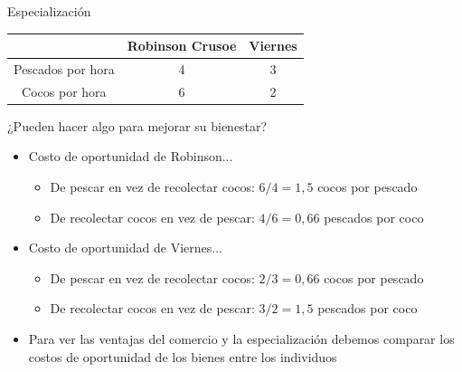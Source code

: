 \documentclass{beamer}
\begin{document}
\begin{frame}{Especialización}
    \begin{center}
        \begin{tabular}{|c|c|c|} \hline
            & Robinson Crusoe & Viernes \\ \hline
            Pescados por hora   & 4 & 3 \\ \hline
            Cocos por hora   & 6 & 2 \\ \hline     
        \end{tabular}
    \end{center}
    ¿Pueden hacer algo para mejorar su bienestar? 

    \begin{itemize}
        \item Costo de oportunidad de Robinson...
            \begin{itemize}
            \item De pescar en vez de recolectar cocos: $ 6/4 = 1,5 $ cocos por pescado 
            \item De recolectar cocos en vez de pescar: $ 4/6 =0,66 $ pescados por coco
            \end{itemize}
        \item Costo de oportunidad de Viernes...
            \begin{itemize}
            \item De pescar en vez de recolectar cocos: $ 2/3 = 0,66 $ cocos por pescado
            \item De recolectar cocos en vez de pescar: $ 3/2 = 1,5 $ pescados por coco
            \end{itemize}
        \item Para ver las ventajas del comercio y la especialización debemos comparar los costos de oportunidad de los bienes entre los individuos
    \end{itemize}
\end{frame}
\end{document}
